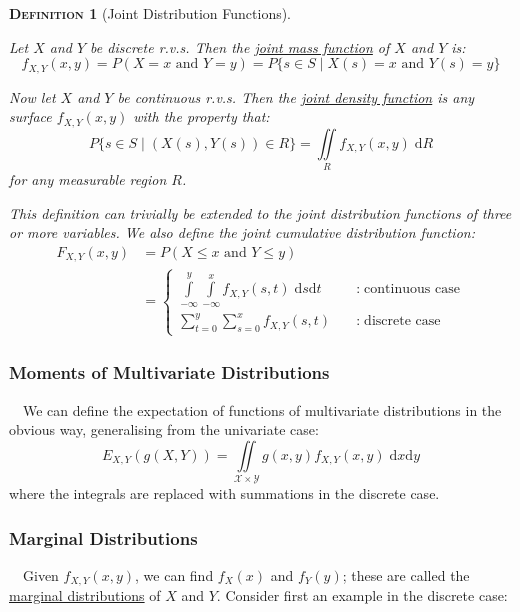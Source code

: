 \documentclass[12pt,a4paper]{article}
\newtheorem{definition}{\textsc{Definition}}[section]
\newcommand{\diff}{\mathrm{d}}
\begin{document}
\begin{definition}[Joint Distribution Functions]$\;$\par
\vspace{1cm}

Let $X$ and $Y$ be discrete r.v.s. Then the \underline{joint mass function} of $X$ and $Y$ is:
$$f_{X,Y}(x,y) = P(X=x \text{ and } Y=y) = P\{s \in S \; | \; X(s) = x \text{ and } Y(s) = y\}$$

Now let $X$ and $Y$ be continuous r.v.s. Then the \underline{joint density function} is any surface $f_{X,Y}(x,y)$ with the property that:
$$P\{s \in S \; | \; (X(s),Y(s)) \in R\} = \iint\limits_R \! f_{X,Y}(x,y)\; \mathrm{d}R$$
for any measurable region $R$.\par
\vspace{1cm}

This definition can trivially be extended to the joint distribution functions of three or more variables. We also define the joint cumulative distribution function:
\begin{align*}
F_{X,Y}(x,y) &= P(X\leq x \text{ and } Y\leq y)\\
&= \left\{ \begin{array}{cl} \int\limits_{-\infty}^y\int\limits_{-\infty}^x\!\! f_{X,Y}(s,t)\;\mathrm{d}s\mathrm{d}t\quad & : \; \text{continuous case}\\ \sum\limits_{t=0}^y\sum\limits_{s=0}^x f_{X,Y}(s,t)\quad & : \; \text{discrete case} \end{array} \right.
\end{align*}

\end{definition}

\subsubsection{Moments of Multivariate Distributions}

$\quad$We can define the expectation of functions of multivariate distributions in the obvious way, generalising from the univariate case:
$$E_{X,Y}(g(X,Y)) = \iint\limits_{\mathcal{X}\times\mathcal{Y}}\!\! g(x,y)f_{X,Y}(x,y)\; \diff x\diff y$$
where the integrals are replaced with summations in the discrete case.

\subsubsection{Marginal Distributions}

$\quad$Given $f_{X,Y}(x,y)$, we can find $f_X(x)$ and $f_Y(y)$; these are called the \underline{marginal distributions} of $X$ and $Y$. Consider first an example in the discrete case:
\end{document}
